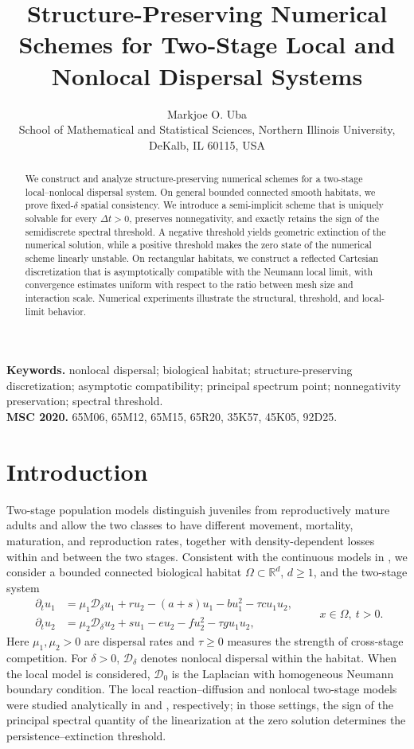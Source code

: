 \documentclass[11pt]{article}
\title{Structure-Preserving Numerical Schemes for Two-Stage Local and Nonlocal Dispersal Systems}
\author{Markjoe O. Uba\\\small School of Mathematical and Statistical Sciences, Northern Illinois University, DeKalb, IL 60115, USA}
\date{}
\theoremstyle{definition}
\newcommand{\R}{\mathbb{R}}
\newcommand{\cD}{\mathcal{D}}
\begin{document}
\maketitle


\begin{abstract}
We construct and analyze structure-preserving numerical schemes for a two-stage local--nonlocal dispersal system. On general bounded connected smooth habitats, we prove fixed-$\delta$ spatial consistency. We introduce a semi-implicit scheme that is uniquely solvable for every $\Delta t>0$, preserves nonnegativity, and exactly retains the sign of the semidiscrete spectral threshold. A negative threshold yields geometric extinction of the numerical solution, while a positive threshold makes the zero state of the numerical scheme linearly unstable. On rectangular habitats, we construct a reflected Cartesian discretization that is asymptotically compatible with the Neumann local limit, with convergence estimates uniform with respect to the ratio between mesh size and interaction scale. Numerical experiments illustrate the structural, threshold, and local-limit behavior.
\end{abstract}

\noindent\textbf{Keywords.} nonlocal dispersal; biological habitat; structure-preserving discretization; asymptotic compatibility; principal spectrum point; nonnegativity preservation; spectral threshold.\\
\textbf{MSC 2020.} 65M06, 65M12, 65M15, 65R20, 35K57, 45K05, 92D25.

\section{Introduction}

Two-stage population models distinguish juveniles from reproductively mature adults and allow the two classes to have different movement, mortality, maturation, and reproduction rates, together with density-dependent losses within and between the two stages.  Consistent with the continuous models in \cite{CCM,CCS,Onyido2023,Onyido2024}, we consider a bounded connected biological habitat $\Omega\subset\R^d$, $d\ge1$, and the two-stage system
\begin{equation}
\label{eq:continuous-delta}
\begin{aligned}
\partial_t u_1
 &=\mu_1\cD_\delta u_1+r u_2-(a+s)u_1-bu_1^2-\tau c u_1u_2,\\
\partial_t u_2
 &=\mu_2\cD_\delta u_2+s u_1-eu_2-fu_2^2-\tau g u_1u_2,
\end{aligned}
\qquad x\in\Omega,\ t>0.
\end{equation}
Here $\mu_1,\mu_2>0$ are dispersal rates and $\tau\ge0$ measures the strength of cross-stage competition.  For $\delta>0$, $\cD_\delta$ denotes nonlocal dispersal within the habitat.  When the local model is considered, $\cD_0$ is the Laplacian with homogeneous Neumann boundary condition.  The local reaction--diffusion and nonlocal two-stage models were studied analytically in \cite{CCM,CCS} and \cite{Onyido2023,Onyido2024}, respectively; in those settings, the sign of the principal spectral quantity of the linearization at the zero solution determines the persistence--extinction threshold.
\end{document}

